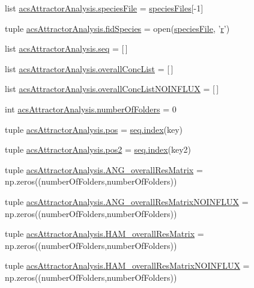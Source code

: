 \begin{DoxyCompactItemize}
\item 
list \hyperlink{a00096_a0e036b776f4f724254115c2e284657eb}{acs\-Attractor\-Analysis.\-species\-File} = \hyperlink{a00028_af5703745c2c2a6af7f62da460994d9c2}{species\-Files}\mbox{[}-\/1\mbox{]}
\item 
tuple \hyperlink{a00096_a604c9f75892d8d8aeac8306c94630a23}{acs\-Attractor\-Analysis.\-fid\-Species} = open(\hyperlink{a00027_a7da0c82834970c5f3c3d9224ab832577}{species\-File}, '\hyperlink{a00031_ac862e7284527eb913b1351c8bfb8e079}{r}')
\item 
list \hyperlink{a00096_a33bc0e3fc99bab3df33d3f1626a19528}{acs\-Attractor\-Analysis.\-seq} = \mbox{[}$\,$\mbox{]}
\item 
list \hyperlink{a00096_aca1d14f4dbff06c02b0e3e362c7ffe14}{acs\-Attractor\-Analysis.\-overall\-Conc\-List} = \mbox{[}$\,$\mbox{]}
\item 
list \hyperlink{a00096_a62444c9b0d66deb07c2e1091695e7561}{acs\-Attractor\-Analysis.\-overall\-Conc\-List\-N\-O\-I\-N\-F\-L\-U\-X} = \mbox{[}$\,$\mbox{]}
\item 
int \hyperlink{a00096_aa5d2495d08b8ad5ebf34f85d5417e93c}{acs\-Attractor\-Analysis.\-number\-Of\-Folders} = 0
\item 
tuple \hyperlink{a00096_abae060beb170fe923fc10b75f9e82079}{acs\-Attractor\-Analysis.\-pos} = \hyperlink{a00060_a0cd6a44ffb07342cbc7e5ac33bfc9495}{seq.\-index}(key)
\item 
tuple \hyperlink{a00096_a6ab79d8205f5d0ae2da47fb0af93149a}{acs\-Attractor\-Analysis.\-pos2} = \hyperlink{a00060_a0cd6a44ffb07342cbc7e5ac33bfc9495}{seq.\-index}(key2)
\item 
tuple \hyperlink{a00096_a43a783e7bdb1094aa477c438bd67259f}{acs\-Attractor\-Analysis.\-A\-N\-G\-\_\-overall\-Res\-Matrix} = np.\-zeros((number\-Of\-Folders,number\-Of\-Folders))
\item 
tuple \hyperlink{a00096_a0d0e0ed8583e4aa041fa6c122324311e}{acs\-Attractor\-Analysis.\-A\-N\-G\-\_\-overall\-Res\-Matrix\-N\-O\-I\-N\-F\-L\-U\-X} = np.\-zeros((number\-Of\-Folders,number\-Of\-Folders))
\item 
tuple \hyperlink{a00096_a46dc8cdfb545b64952370e51ff02336f}{acs\-Attractor\-Analysis.\-H\-A\-M\-\_\-overall\-Res\-Matrix} = np.\-zeros((number\-Of\-Folders,number\-Of\-Folders))
\item 
tuple \hyperlink{a00096_a9aa1adb46370d97e4f38e7f09eb7a97c}{acs\-Attractor\-Analysis.\-H\-A\-M\-\_\-overall\-Res\-Matrix\-N\-O\-I\-N\-F\-L\-U\-X} = np.\-zeros((number\-Of\-Folders,number\-Of\-Folders))
\item 

\end{DoxyCompactItemize}
